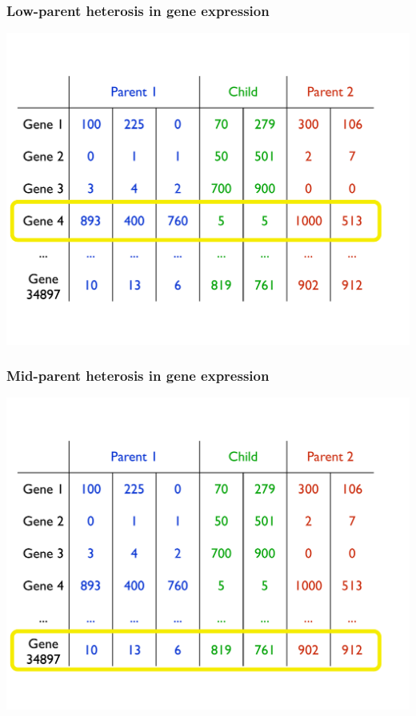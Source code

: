 \documentclass[handout]{beamer}
\numberwithin{equation}{section}
\begin{document}
\begin{frame}
\frametitle{Low-parent heterosis in gene expression}
\begin{center}
\includegraphics[scale=.35]{fig/lphrnaseq}
\end{center}
\end{frame}

\begin{frame}
\frametitle{Mid-parent heterosis in gene expression}
\begin{center}
\includegraphics[scale=.35]{fig/mphrnaseq}
\end{center}
\end{frame}
\end{document}
